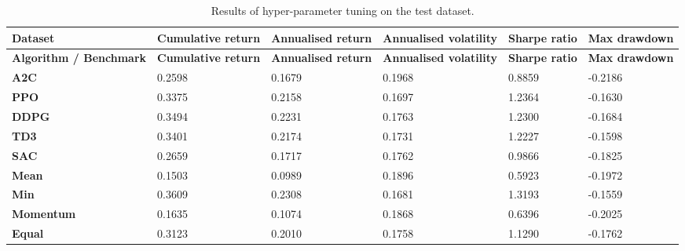 \begin{longtable}{|p{2cm}|p{2.1cm}|p{2.1cm}|p{2.1cm}|p{1.5cm}|p{2cm}|}
    \caption{Results of hyper-parameter tuning on the test dataset.}
    \label{tab:test_results}
    \\ 
    \hline
    \textbf{Dataset} & \textbf{Cumulative return} & \textbf{Annualised return} & \textbf{Annualised volatility} & \textbf{Sharpe ratio} & \textbf{Max drawdown}  \\ \midrule
    \endfirsthead

    \hline
    \textbf{Algorithm / Benchmark} & \textbf{Cumulative return} & \textbf{Annualised return} & \textbf{Annualised volatility} & \textbf{Sharpe ratio} & \textbf{Max drawdown}  \\ \midrule
    \endhead

    \endfoot
    \hline

    \textbf{A2C} & 0.2598 & 0.1679 & 0.1968 & 0.8859 & -0.2186 \\ \hline
    \textbf{PPO} & 0.3375 & 0.2158 & 0.1697 & 1.2364 & -0.1630 \\ \hline
    \textbf{DDPG} & 0.3494 & 0.2231 & 0.1763 & 1.2300 & -0.1684 \\ \hline
    \textbf{TD3} & 0.3401 & 0.2174 & 0.1731 & 1.2227 & -0.1598 \\ \hline
    \textbf{SAC} & 0.2659 & 0.1717 & 0.1762 & 0.9866 & -0.1825 \\ \hline
    \textbf{Mean} & 0.1503 & 0.0989 & 0.1896 & 0.5923 & -0.1972 \\ \hline
    \textbf{Min} & 0.3609 & 0.2308 & 0.1681 & 1.3193 & -0.1559 \\ \hline
    \textbf{Momentum} & 0.1635 & 0.1074 & 0.1868 & 0.6396 & -0.2025 \\ \hline
    \textbf{Equal} & 0.3123 & 0.2010 & 0.1758 & 1.1290 & -0.1762 \\ \hline
\end{longtable}